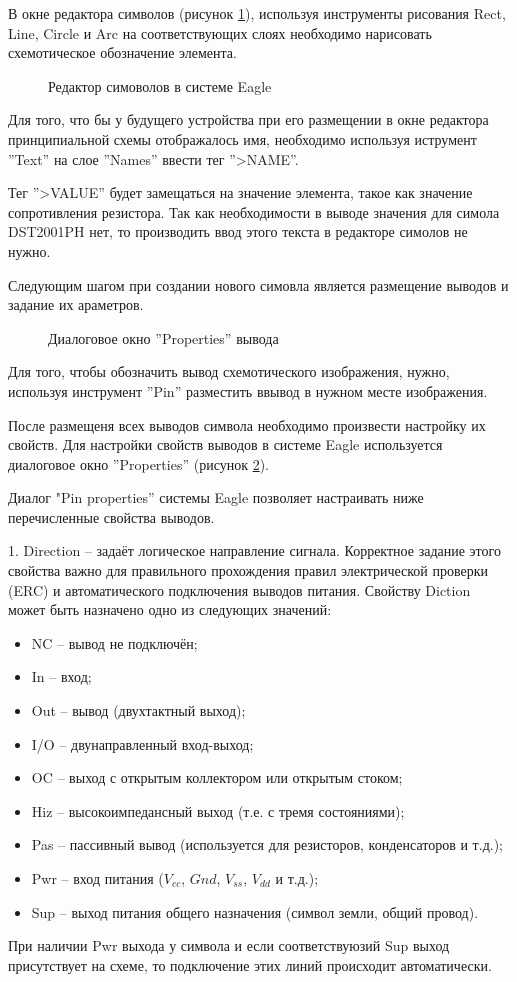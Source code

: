 В окне редактора символов (рисунок \ref{img:symbol}), используя инструменты рисования
Rect, Line, Circle и Arc на соответствующих слоях необходимо нарисовать схемотическое
обозначение элемента.
\begin{figure}[ht]
	\caption{Редактор симоволов в системе Eagle}
	\label{img:symbol}
\end{figure}
Для того, что бы у будущего устройства при его размещении в окне редактора принципиальной
схемы отображалось имя, необходимо используя иструмент ''Text'' на слое ''Names'' ввести
тег ''>NAME''.

Тег ''>VALUE'' будет замещаться на значение элемента, такое как значение
сопротивления резистора. Так как необходимости в выводе значения для симола DST2001PH нет,
то производить ввод этого текста в редакторе симолов не нужно.

Следующим шагом при создании нового симовла является размещение выводов и задание их
араметров.
\begin{figure}[ht]
	\caption{Диалоговое окно ''Properties'' вывода}
	\label{img:pinProperty}
\end{figure}
Для того, чтобы обозначить вывод схемотического изображения, нужно, используя инструмент
''Pin'' разместить ввывод в нужном месте изображения.


После размещеня всех выводов символа необходимо произвести настройку их свойств.
Для настройки свойств выводов в системе Eagle используется диалоговое окно
''Properties'' (рисунок \ref{img:pinProperty}).


Диалог "Pin properties'' системы Eagle позволяет настраивать ниже перечисленные свойства выводов.

1.	Direction -- задаёт логическое направление сигнала. Корректное задание этого свойства
важно для правильного прохождения правил электрической проверки (ERC) и автоматического
подключения выводов питания. Свойству Diction может быть назначено одно из следующих
значений:
\begin{itemize}
	\item{} NC  -- вывод не подключён;
	\item{} In  -- вход;
	\item{} Out -- вывод (двухтактный выход);
	\item{} I/O -- двунаправленный вход-выход;
	\item{} OC -- выход с открытым коллектором или открытым стоком;
	\item{} Hiz  -- высокоимпедансный выход (т.е. с тремя состояниями);
	\item{} Pas -- пассивный вывод (используется для резисторов, конденсаторов и т.д.);
	\item{} Pwr -- вход питания ($V_{cc}$, $Gnd$, $V_{ss}$, $V_{dd}$ и т.д.);
	\item{} Sup -- выход питания общего назначения (символ земли, общий провод).
\end{itemize}
При наличии Pwr выхода у символа и если соответствуюзий Sup выход присутствует на схеме,
то подключение этих линий происходит автоматически.


